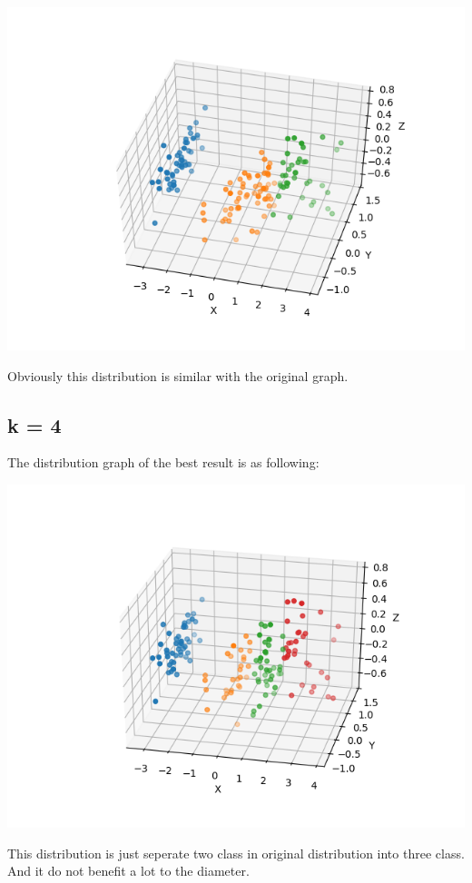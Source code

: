 \documentclass[11pt]{article}
\begin{document}
\includegraphics[width=.9\linewidth]{cluster=3.png}

Obviously this distribution is similar with the original graph.

\subsection{k = 4}
\label{sec-2-3}
The distribution graph of the best result is as following:

\includegraphics[width=.9\linewidth]{cluster=4.png}

This distribution is just seperate two class in original distribution into
three class. And it do not benefit a lot to the diameter.
\end{document}

